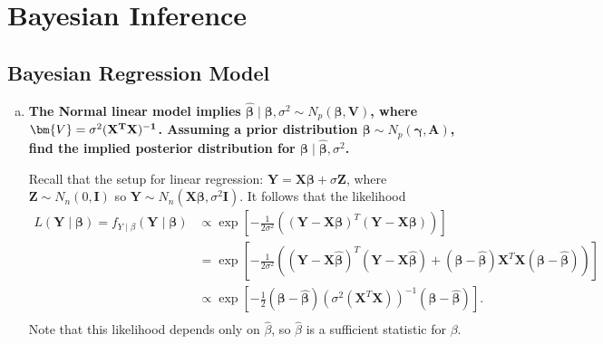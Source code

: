 \newpage
\setcounter{section}{12}
\section{Bayesian Inference}

\subsection{Bayesian Regression Model}
\graphicspath{{notes/img}}

\begin{enumerate}[a)]
\item \textbf{The Normal linear model implies $\hat{\bm{\beta}} \mid \bm{\beta}, \sigma^2 \sim N_p(\bm{\beta}, \bm{V})$, where
$\bm{V} = \sigma^2 (\bf{X}^T \bf{X})^{-1}$. Assuming a prior distribution $\bm{\beta} \sim N_p(\bm{\gamma}, \bm{A})$, find the implied
posterior distribution for $\bm{\beta} \mid \hat{\bm{\beta}}, \sigma^2$.}
 
Recall that the setup for linear regression: $\bm{Y} = \bm{X\beta} + \sigma \bm{Z}$, where $\bm{Z} \sim N_n(0, \bm{I})$ so $\bm{Y} \sim N_n(\bm{X\beta}, \sigma^2\bm{I})$. It follows that
the likelihood
\begin{align*}
    L(\bm{Y} \mid \bm{\beta}) = f_{Y \mid \beta}(\bm{Y} \mid \bm{\beta}) &\propto \exp \left[ -\frac{1}{2\sigma^2} \left( (\bm{Y} - \bm{X\beta})^T (\bm{Y} -\bm{X\beta}) \right) \right] \\
    &= \exp \left[ -\frac{1}{2\sigma^2} \left( (\bm{Y} - \bm{X}\hat{\bm{\beta}})^T(\bm{Y} - \bm{X\hat{\bm{\beta}}}) + (\bm{\beta} - \hat{\bm{\beta}})\bm{X}^T\bm{X}(\bm{\beta} - \hat{\bm{\beta}}) \right) \right] \\
    &\propto \exp \left[ -\frac{1}{2} (\bm{\beta} - \hat{\bm{\beta}})\left(\sigma^2(\bm{X}^T\bm{X})\right)^{-1}(\bm{\beta} - \hat{\bm{\beta}}) \right]. \\
\end{align*}
Note that this likelihood depends only on $\hat{\beta}$, so $\hat{\beta}$ is a sufficient statistic for $\beta$. \\


\end{enumerate}
